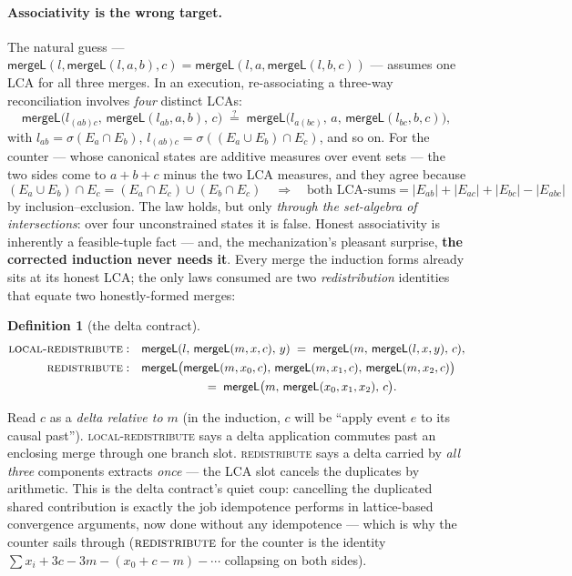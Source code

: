 \documentclass[11pt]{article}
\newtheorem{definition}[theorem]{Definition}
\newcommand{\mergeL}{\mathsf{mergeL}}
\begin{document}
\paragraph{Associativity is the wrong target.} The natural guess ---
$\mergeL(l,\mergeL(l,a,b),c) = \mergeL(l,a,\mergeL(l,b,c))$ --- assumes
one LCA for all three merges. In an execution, re-associating a three-way
reconciliation involves \emph{four} distinct LCAs:
\[
  \mergeL\bigl(l_{(ab)c},\, \mergeL(l_{ab}, a, b),\, c\bigr)
  \;\overset{?}{=}\;
  \mergeL\bigl(l_{a(bc)},\, a,\, \mergeL(l_{bc}, b, c)\bigr),
\]
with $l_{ab} = \sigma(E_a \cap E_b)$, $l_{(ab)c} = \sigma((E_a \cup E_b)
\cap E_c)$, and so on. For the counter --- whose canonical states are
additive measures over event sets --- the two sides come to $a+b+c$ minus
the two LCA measures, and they agree because
\[
  (E_a \cup E_b) \cap E_c = (E_a \cap E_c) \cup (E_b \cap E_c)
  \quad\Longrightarrow\quad
  \text{both LCA-sums} = |E_{ab}| + |E_{ac}| + |E_{bc}| - |E_{abc}|
\]
by inclusion--exclusion. The law holds, but only \emph{through the
set-algebra of intersections}: over four unconstrained states it is false.
Honest associativity is inherently a feasible-tuple fact --- and, the
mechanization's pleasant surprise, \textbf{the corrected induction never
needs it}. Every merge the induction forms already sits at its honest LCA;
the only laws consumed are two \emph{redistribution} identities that
equate two honestly-formed merges:

\begin{definition}[the delta contract]
\label{def:delta}
\begin{align*}
\textsc{local-redistribute}:&\quad
  \mergeL(l,\, \mergeL(m, x, c),\, y) \;=\; \mergeL(m,\, \mergeL(l, x,
  y),\, c),\\
\textsc{redistribute}:&\quad
  \mergeL\bigl(\mergeL(m,x_0,c),\, \mergeL(m,x_1,c),\, \mergeL(m,x_2,c)\bigr)\\
  &\qquad\qquad\qquad\;=\; \mergeL\bigl(m,\, \mergeL(x_0,x_1,x_2),\, c\bigr).
\end{align*}
\end{definition}

Read $c$ as a \emph{delta relative to $m$} (in the induction, $c$ will be
``apply event $e$ to its causal past''). \textsc{local-redistribute} says
a delta application commutes past an enclosing merge through one branch
slot. \textsc{redistribute} says a delta carried by \emph{all three}
components extracts \emph{once} --- the LCA slot cancels the duplicates by
arithmetic. This is the delta contract's quiet coup: cancelling the
duplicated shared contribution is exactly the job idempotence performs in
lattice-based convergence arguments, now done without any idempotence ---
which is why the
counter sails through ($\textsc{redistribute}$ for the counter is the
identity $\sum x_i + 3c - 3m - (x_0 + c - m) - \cdots$ collapsing on both
sides).
\end{document}
